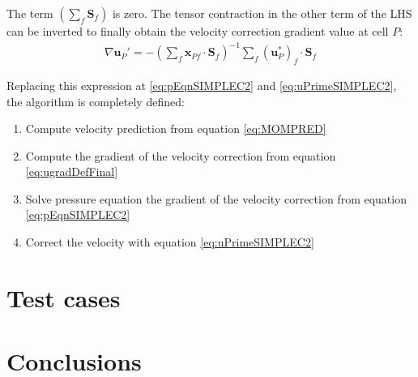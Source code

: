 \documentclass[final,3p,times,10pt,onecolumn]{myElsarticle}
\numberwithin{equation}{section}
\begin{document}
The term $\left(\sum_f \boldsymbol{S}_f\right)$ is zero. The tensor contraction in the other term of the LHS can be inverted to finally obtain the velocity correction gradient value at cell $P$:
\begin{equation}\label{eq:ugradDefFinal}
\begin{split}
\nabla \boldsymbol{u}_P' = -
\left(\sum_f \boldsymbol{x}_{Pf} \cdot \boldsymbol{S}_f\right)^{-1} \sum_f \left(\boldsymbol{u}_P^{*}\right)_f \cdot \boldsymbol{S}_f
\end{split}
\end{equation}

Replacing this expression at \ref{eq:pEqnSIMPLEC2} and \ref{eq:uPrimeSIMPLEC2}, the algorithm is completely defined:

\begin{enumerate}
\item Compute velocity prediction from equation \ref{eq:MOMPRED}
\item Compute the gradient of the velocity correction  from equation \ref{eq:ugradDefFinal}
\item Solve pressure equation  the gradient of the velocity correction from equation \ref{eq:pEqnSIMPLEC2}
\item Correct the velocity with equation \ref{eq:uPrimeSIMPLEC2}
\end{enumerate}

\section{Test cases}
\label{sec:cases}

\section{Conclusions}
\label{sec:conclusions}



\end{document}
